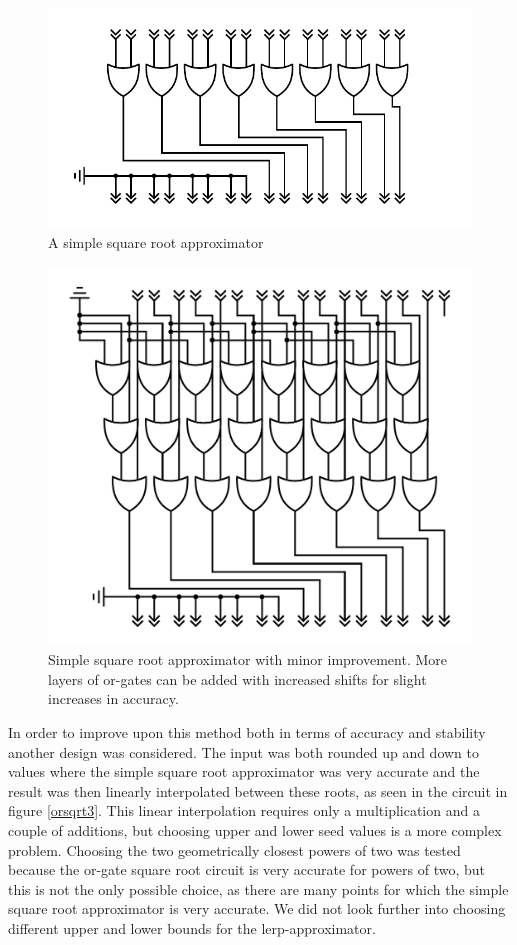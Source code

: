			\begin{figure}
				\centering
				\caption{A simple square root approximator}
				\label{orsqrt}
				\includegraphics[width=0.75\linewidth]{figure/pdf/simpleOr.pdf} 
			\end{figure}

			\begin{figure}
				\centering
				\caption{Simple square root approximator with minor improvement.
					More layers of or-gates can be added with increased shifts 
					for slight increases in accuracy. }
				\label{orsqrt2}
				\includegraphics[width=0.75\linewidth]{figure/pdf/sqrt3Or.pdf} 
			\end{figure}

			In order to improve upon this method both in terms of accuracy and
			stability another design was considered. The input was both rounded up
			and down to values where the simple square root approximator was very
			accurate and the result was then linearly interpolated between these
			roots, as seen in the circuit in figure \ref{orsqrt3}. This linear interpolation
			requires only a multiplication and a couple of additions, but choosing
			upper and lower seed values is a more complex problem. Choosing the two
			geometrically closest powers of two was tested because the or-gate square
			root circuit is very accurate for powers of two, but this is not the only
			possible choice, as there are many points for which the simple square
			root approximator is very accurate. We did not look further into choosing
			different upper and lower bounds for the lerp-approximator.

